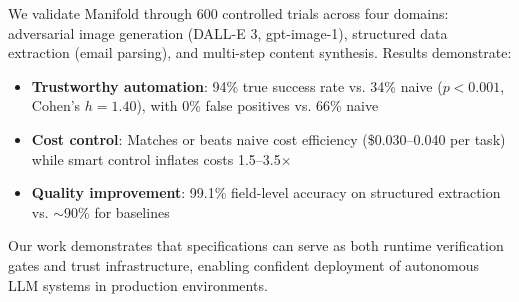 \documentclass{article}
\begin{document}
We validate Manifold through 600 controlled trials across four domains: adversarial image generation (DALL-E 3, gpt-image-1), structured data extraction (email parsing), and multi-step content synthesis. Results demonstrate:
\begin{itemize}
\item \textbf{Trustworthy automation}: 94\% true success rate vs. 34\% naive ($p < 0.001$, Cohen's $h = 1.40$), with 0\% false positives vs. 66\% naive
\item \textbf{Cost control}: Matches or beats naive cost efficiency (\$0.030--0.040 per task) while smart control inflates costs 1.5--3.5$\times$
\item \textbf{Quality improvement}: 99.1\% field-level accuracy on structured extraction vs. $\sim$90\% for baselines
\end{itemize}
Our work demonstrates that specifications can serve as both runtime verification gates and trust infrastructure, enabling confident deployment of autonomous LLM systems in production environments.

\end{document}
